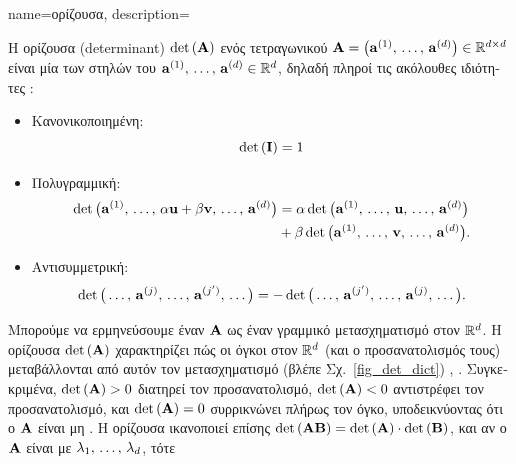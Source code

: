 {name={\foreignlanguage{greek}{ορίζουσα}},
	description={\foreignlanguage{greek}{Η ορίζουσα} (determinant) $\det\,({\bf A})$ 
		\foreignlanguage{greek}{ενός τετραγωνικού}  
		$\mA =\linebreak \big( \va^{(1)},\,\ldots,\,\va^{(\nrfeatures)} \big) \in \mathbb{R}^{\nrfeatures \times \nrfeatures}$ 
		\foreignlanguage{greek}{είναι μία}  \foreignlanguage{greek}{των στηλών του\linebreak 
		${\bf a}^{(1)},\,\ldots,\,{\bf a}^{(d)} \in \mathbb{R}^{d}$, δηλαδή πληροί τις ακόλουθες ιδιότητες} 
		\cite{DirschmidHansJorg1996TuF}:
		\begin{itemize}
			\item \foreignlanguage{greek}{Κανονικοποιημένη}: $$\det\,(\mathbf{I}) = 1$$ 
			\item \foreignlanguage{greek}{Πολυγραμμική}: \begin{align} \nonumber \det \big({\bf a}^{(1)},\,\ldots,\,\alpha{\bf u}+ \beta {\bf v},\,\ldots,\,{\bf a}^{(d)} \big) & = \alpha\det \big({\bf a}^{(1)},\,\ldots,\,{\bf u},\,\ldots,\,{\bf a}^{(d)} \big) \\ 
			& +\beta\det \big({\bf a}^{(1)},\,\ldots,\,{\bf v},\,\ldots,\,{\bf a}^{(d)} \big). \nonumber
			\end{align}
			\item \foreignlanguage{greek}{Αντισυμμετρική}: $$\det \big(\ldots,\,{\bf a}^{(j)}, \,\ldots, \,{\bf a}^{(j')},\,\ldots \big) = - \det \big(\ldots,\,{\bf a}^{(j')}, \,\ldots, \,{\bf a}^{(j)},\,\ldots \big).$$  
		\end{itemize}  
		\foreignlanguage{greek}{Μπορούμε να ερμηνεύσουμε έναν}  ${\bf A}$ \foreignlanguage{greek}{ως έναν γραμμικό
		μετασχηματισμό στον $\mathbb{R}^{d}$. Η ορίζουσα $\det\,({\bf A})$ χαρακτηρίζει πώς οι όγκοι στον $\mathbb{R}^d$ 
		(και ο προσανατολισμός τους) μεταβάλλονται από αυτόν τον μετασχηματισμό (βλέπε Σχ.}\ \ref{fig_det_dict}) 
		\cite{GolubVanLoanBook}, \cite{Strang2007}. 
 		\foreignlanguage{greek}{Συγκεκριμένα, $\det\,({\bf A}) > 0$ διατηρεί τον προσανατολισμό, $\det\,({\bf A}) < 0$ αντιστρέφει τον προσανατολισμό, 
 		και $\det\,({\bf A}) = 0$ συρρικνώνει πλήρως τον όγκο, υποδεικνύοντας ότι ο ${\bf A}$ είναι μη} . 
 		\foreignlanguage{greek}{Η ορίζουσα ικανοποιεί επίσης $\det\,({\bf A} {\bf B}) = \det\,({\bf A}) \cdot \det\,({\bf B})$, και αν ο ${\bf A}$ είναι}  
		\foreignlanguage{greek}{με}  $\lambda_{1}, \,\ldots, \,\lambda_{d}$, \foreignlanguage{greek}{τότε} 
}}
